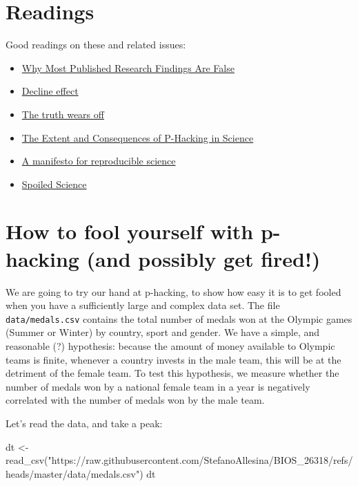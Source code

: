 \documentclass[
  letterpaper,
  DIV=11,
  numbers=noendperiod]{scrreprt}
\newenvironment{Shaded}{\begin{snugshade}}{\end{snugshade}}
\newcommand{\NormalTok}[1]{\textcolor[rgb]{0.00,0.23,0.31}{#1}}
\providecommand{\tightlist}{%
  \setlength{\itemsep}{0pt}\setlength{\parskip}{0pt}}\usepackage{longtable,booktabs,array}
\begin{document}
\section{Readings}\label{readings}

Good readings on these and related issues:

\begin{itemize}
\tightlist
\item
  \href{https://journals.plos.org/plosmedicine/article?id=10.1371/journal.pmed.0020124}{Why
  Most Published Research Findings Are False}
\item
  \href{https://en.wikipedia.org/wiki/Decline_effect}{Decline effect}
\item
  \href{https://www.newyorker.com/magazine/2010/12/13/the-truth-wears-off}{The
  truth wears off}
\item
  \href{https://journals.plos.org/plosbiology/article?id=10.1371/journal.pbio.1002106}{The
  Extent and Consequences of P-Hacking in Science}
\item
  \href{https://www.nature.com/articles/s41562-016-0021}{A manifesto for
  reproducible science}
\item
  \href{https://www.chronicle.com/article/Spoiled-Science/239529}{Spoiled
  Science}
\end{itemize}

\section{How to fool yourself with p-hacking (and possibly get
fired!)}\label{how-to-fool-yourself-with-p-hacking-and-possibly-get-fired}

We are going to try our hand at p-hacking, to show how easy it is to get
fooled when you have a sufficiently large and complex data set. The file
\texttt{data/medals.csv} contains the total number of medals won at the
Olympic games (Summer or Winter) by country, sport and gender. We have a
simple, and reasonable (?) hypothesis: because the amount of money
available to Olympic teams is finite, whenever a country invests in the
male team, this will be at the detriment of the female team. To test
this hypothesis, we measure whether the number of medals won by a
national female team in a year is negatively correlated with the number
of medals won by the male team.

Let's read the data, and take a peak:

\begin{Shaded}
\begin{Highlighting}[]
\NormalTok{dt \textless{}{-} read\_csv("https://raw.githubusercontent.com/StefanoAllesina/BIOS\_26318/refs/heads/master/data/medals.csv")}
\NormalTok{dt}
\end{Highlighting}
\end{Shaded}
\end{document}
